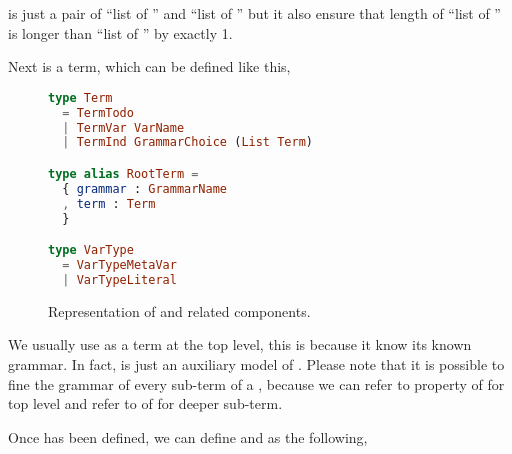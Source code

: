 \documentclass[master.tex]{subfiles}
\begin{document}
 is just a pair of ``list of
'' and ``list of '' but it also ensure that
length of ``list of '' is longer than ``list of
'' by exactly 1.

Next is a term, which can be defined like this,

\begin{figure}[H]
\begin{framed}
\begin{lstlisting}[language=elm]
type Term
  = TermTodo
  | TermVar VarName
  | TermInd GrammarChoice (List Term)

type alias RootTerm =
  { grammar : GrammarName
  , term : Term
  }

type VarType
  = VarTypeMetaVar
  | VarTypeLiteral
\end{lstlisting}
\end{framed}
\caption{Representation of  and related components.}
\label{fig:implementation-repo-term}
\end{figure}

We usually use  as a term at the top level, this is because it
know its known grammar. In fact,  is just an auxiliary model of
. Please note that it is possible to fine the grammar of every
sub-term of a , because we can refer to 
property of  for top level and refer to 
of  for deeper sub-term.

Once  has been defined, we can define  and
 as the following,
\end{document}
